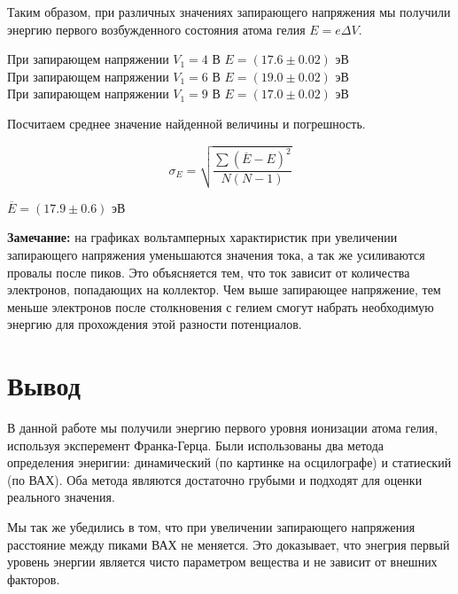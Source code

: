     Таким образом, при различных значениях запирающего напряжения мы получили энергию первого возбужденного
    состояния атома гелия $E = e \Delta V$.

    \begin{center}
        При запирающем напряжении $V_1 = 4$ В $E = (17.6 \pm 0.02)$ эВ \\
        При запирающем напряжении $V_1 = 6$ В $E = (19.0 \pm 0.02)$ эВ \\
        При запирающем напряжении $V_1 = 9$ В $E = (17.0 \pm 0.02)$ эВ \\
    \end{center}

    Посчитаем среднее значение найденной величины и погрешность.

    \[ \sigma_E = \sqrt{\frac{\sum (\overline{E} - E)^2}{N(N-1)}} \]

    \begin{center}
        $\overline{E} = (17.9 \pm 0.6)$ эВ
    \end{center}

    \textbf{Замечание:} на графиках вольтамперных характиристик при увеличении запирающего напряжения
    уменьшаются значения тока, а так же усиливаются провалы после пиков. Это объясняется тем, что
    ток зависит от количества электронов, попадающих на коллектор. Чем выше запирающее напряжение, тем
    меньше электронов после столкновения с гелием смогут набрать необходимую энергию для прохождения
    этой разности потенциалов.

    \section*{Вывод}

    В данной работе мы получили энергию первого уровня ионизации атома гелия, используя эксперемент
    Франка-Герца. Были использованы два метода определения энеригии: динамический (по картинке на
    осцилографе) и статиеский (по ВАХ). Оба метода являются достаточно грубыми и подходят для оценки
    реального значения.
    
    Мы так же убедились в том, что при увеличении запирающего напряжения расстояние между пиками
    ВАХ не меняется. Это доказывает, что энегрия первый уровень энергии является чисто параметром вещества
    и не зависит от внешних факторов.

